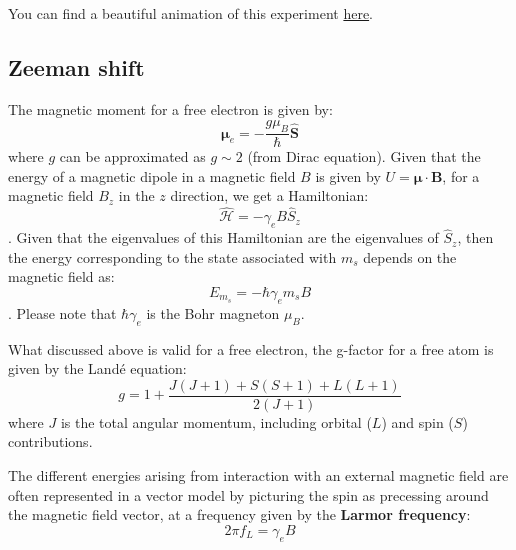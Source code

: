 \documentclass[a4paper,11pt]{article}
\begin{document}
You can find a beautiful animation of this experiment \href{https://www.youtube.com/watch?v=rg4Fnag4V-E}{here}.

\subsection {Zeeman shift}
The magnetic moment for a free electron is given by:
\begin{equation}
    \mathbf{\mu}_e = -\frac{g \mu_B}{\hbar} \mathbf{\hat{S}}
\end{equation}
where $g$ can be approximated as $g \sim 2$ (from Dirac equation).
\newline Given that the energy of a magnetic dipole in a magnetic field $B$ is given by $U = \mathbf{\mu} \cdot \mathbf{B}$, for a magnetic field $B_z$ in the $z$ direction, we get a Hamiltonian:
\begin{equation}
    \mathcal{\hat{H}} = -\gamma_e B \hat{S}_z 
\end{equation}. Given that the eigenvalues of this Hamiltonian are the eigenvalues of $\hat{S}_z$, then the energy corresponding to the state associated with $m_s$ depends on the magnetic field as:
\begin{equation}
\label{eq:zeeman}
    E_{m_s} = -\hbar \gamma_e m_s B
\end{equation}. Please note that $\hbar \gamma_e$ is the Bohr magneton $\mu_B$.

What discussed above is valid for a free electron, the g-factor for a free atom is given by the Land\'e equation:
\begin{equation*}
    g = 1 + \frac{J(J+1)+S(S+1)+L(L+1)}{2(J+1)}
\end{equation*}
where $J$ is the total angular momentum, including orbital ($L$) and spin ($S$) contributions.

The different energies arising from interaction with an external magnetic field are often represented in a vector model by picturing the spin as precessing around the magnetic field vector, at a frequency given by the {\bf Larmor frequency}:
\begin{equation}
    \label{eq:larmor}
    2\pi f_L = \gamma_e B 
\end{equation}
\end{document}
